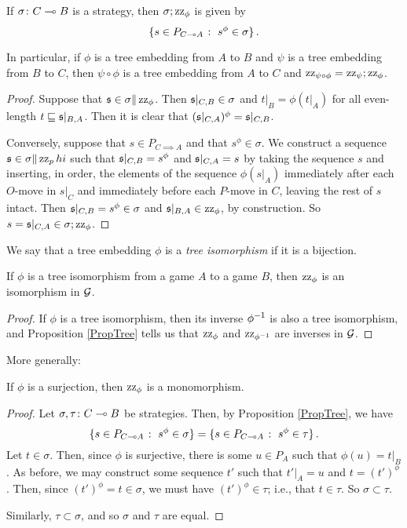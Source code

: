 \documentclass[11pt]{report}
\begin{document}
\begin{proposition}
  If $\sigma\colon C \multimap B$ is a strategy, then $\sigma;\operatorname{zz}_\phi$ is given by
  \[
    \{s\in P_{C\multimap A}\;\colon\; s^\phi\in\sigma\}\,.
    \]

  In particular, if $\phi$ is a tree embedding from $A$ to $B$ and $\psi$ is a tree embedding from $B$ to $C$, then $\psi\circ\phi$ is a tree embedding from $A$ to $C$ and $\operatorname{zz}_{\psi\circ\phi}=\operatorname{zz}_\psi;\operatorname{zz}_\phi$.
  \label{PropTree}
\end{proposition}
\begin{proof}
  Suppose that $\mathfrak s\in\sigma\|\operatorname{zz}_\phi$.  
  Then $\mathfrak s\vert_{C,B}\in\sigma$ and $t\vert_B=\phi(t\vert_A)$ for all even-length $t\sqsubseteq \mathfrak s\vert_{B,A}$.  
  Then it is clear that $(\mathfrak s\vert_{C,A})^\phi=\mathfrak s\vert_{C,B}$.  

  Conversely, suppose that $s\in P_{C\implies A}$ and that $s^\phi\in\sigma$.  
  We construct a sequence $\mathfrak s\in\sigma\|\operatorname{zz}_phi$ such that $\mathfrak s\vert_{C,B}=s^\phi$ and $\mathfrak s\vert_{C,A}=s$ by taking the sequence $s$ and inserting, in order, the elements of the sequence $\phi(s\vert_A)$ immediately after each $O$-move in $s\vert_C$ and immediately before each $P$-move in $C$, leaving the rest of $s$ intact.  
  Then $\mathfrak s\vert_{C,B}=s^\phi\in\sigma$ and $\mathfrak s\vert_{B,A}\in\operatorname{zz}_\phi$, by construction.  
  So $s=\mathfrak s\vert_{C,A}\in \sigma;\operatorname{zz}_\phi$.
\end{proof}

\begin{definition}
  We say that a tree embedding $\phi$ is a \emph{tree isomorphism} if it is a bijection.
\end{definition}

\begin{proposition}
  If $\phi$ is a tree isomorphism from a game $A$ to a game $B$, then $\operatorname{zz}_\phi$ is an isomorphism in $\mathcal G$.
\end{proposition}
\begin{proof}
  If $\phi$ is a tree isomorphism, then its inverse $\phi^{-1}$ is also a tree isomorphism, and Proposition \ref{PropTree} tells us that $\operatorname{zz}_\phi$ and $\operatorname{zz}_{\phi^{-1}}$ are inverses in $\mathcal G$.
\end{proof}

More generally:

\begin{proposition}
  If $\phi$ is a surjection, then $\operatorname{zz}_\phi$ is a monomorphism.
  \label{PropZigzagMono}
\end{proposition}
\begin{proof}
  Let $\sigma,\tau\colon C \multimap B$ be strategies.
  Then, by Proposition \ref{PropTree}, we have
  \[
    \{s\in P_{C\multimap A}\;\colon\; s^\phi\in\sigma\} = \{s\in P_{C\multimap A}\;\colon\; s^\phi\in\tau\}\,.
    \]
  Let $t\in\sigma$.  
  Then, since $\phi$ is surjective, there is some $u\in P_A$ such that $\phi(u)=t\vert_B$.  
  As before, we may construct some sequence $t'$ such that $t'\vert_A=u$ and $t=(t')^\phi$.  
  Then, since $(t')^\phi=t\in\sigma$, we must have $(t')^\phi\in\tau$; i.e., that $t\in\tau$.  
  So $\sigma\subset\tau$.  
  
  Similarly, $\tau\subset\sigma$, and so $\sigma$ and $\tau$ are equal.
\end{proof}
\end{document}
